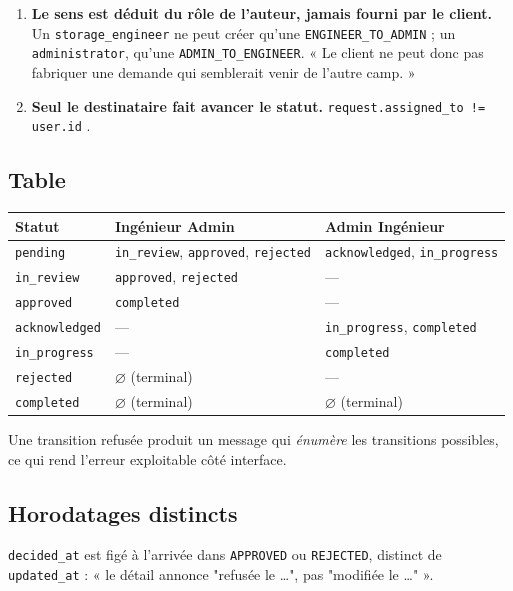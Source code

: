 \begin{enumerate}
  \item \textbf{Le sens est déduit du rôle de l'auteur, jamais fourni par le
  client.} Un \texttt{storage\_engineer} ne peut créer qu'une
  \texttt{ENGINEER\_TO\_ADMIN} ; un \texttt{administrator}, qu'une
  \texttt{ADMIN\_TO\_ENGINEER}. « Le client ne peut donc pas fabriquer une
  demande qui semblerait venir de l'autre camp. »
  \item \textbf{Seul le destinataire fait avancer le statut.}
  \texttt{request.assigned\_to != user.id} \arrowto{} .
\end{enumerate}

\subsection*{Table }

\begin{longtable}{@{}p{3.0cm}p{5.4cm}p{6.2cm}@{}}
\toprule
\textbf{Statut} & \textbf{Ingénieur \arrowto{} Admin} & \textbf{Admin \arrowto{} Ingénieur}\\
\midrule
\endhead
\texttt{pending} & \texttt{in\_review}, \texttt{approved}, \texttt{rejected} & \texttt{acknowledged}, \texttt{in\_progress}\\
\texttt{in\_review} & \texttt{approved}, \texttt{rejected} & ---\\
\texttt{approved} & \texttt{completed} & ---\\
\texttt{acknowledged} & --- & \texttt{in\_progress}, \texttt{completed}\\
\texttt{in\_progress} & --- & \texttt{completed}\\
\texttt{rejected} & \(\varnothing\) (terminal) & ---\\
\texttt{completed} & \(\varnothing\) (terminal) & \(\varnothing\) (terminal)\\
\bottomrule
\end{longtable}

\noindent
Une transition refusée produit un message qui \emph{énumère} les transitions
possibles, ce qui rend l'erreur exploitable côté interface.

\subsection*{Horodatages distincts}
\texttt{decided\_at} est figé à l'arrivée dans \texttt{APPROVED} ou
\texttt{REJECTED}, distinct de \texttt{updated\_at} : « le détail annonce
"refusée le \ldots", pas "modifiée le \ldots" ».

